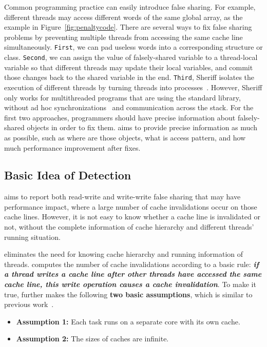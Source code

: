 Common programming practice can easily introduce false sharing. For example, different threads may access different words of the same global array, as the example in Figure~\ref{fig:penaltycode}. There are several ways to fix false sharing problems by preventing multiple threads from accessing the same cache line simultaneously. {\tt First},  we can pad useless words into a corresponding structure or class. {\tt Second}, we can assign the value of falsely-shared variable to a thread-local variable so that different threads may update their local variables, and commit those changes back to the shared variable in the end. {\tt Third}, Sheriff isolates the execution of different threads by turning threads into processes~\cite{sheriff}. However, Sheriff only works for multithreaded programs that are using the standard \pthreads{} library, without ad hoc synchronizations~\cite{Xiong:2010:AHS:1924943.1924955} and communication across the stack. For the first two approaches, programmers should have precise information about falsely-shared objects in order to fix them. \cheetah{} aims to provide precise information as much as possible, such as where are those objects, what is access pattern, and how much performance improvement after fixes. 

\subsection{Basic Idea of Detection}
\label{sec:basicidea}
\cheetah{} aims to report both read-write and write-write false sharing that may have performance impact, where a large number of cache invalidations occur on those cache lines. However, it is not easy to know whether a cache line is invalidated or not, without the complete information of cache hierarchy and different threads' running situation. 

\cheetah{} eliminates the need for knowing cache hierarchy and running information of threads. \cheetah{} computes the number of cache invalidations according to a basic rule: {\it \bf if a thread writes a cache line after other threads have accessed the same cache line, this write operation causes a cache invalidation}. To make it true, \cheetah{} further makes the following \textbf{two basic assumptions}, which is similar to previous work~\cite{qinzhao, Predator}.

\begin{itemize} 
\item {\bf Assumption 1:} Each task runs on a separate core with its own cache. 

\item {\bf Assumption 2: } The sizes of caches are infinite. 
 
\end{itemize}

